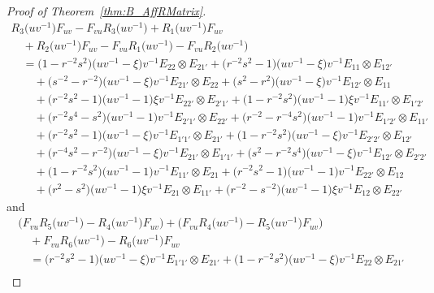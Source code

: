 \documentclass[10pt,a4paper]{amsart}
\numberwithin{equation}{section}
\begin{document}
\begin{proof}[Proof of Theorem~\ref{thm:B_AffRMatrix}]
\begin{gather}
 R_{3}\bigl(uv^{-1}\bigr)F_{uv} - F_{vu}R_{3}\bigl(uv^{-1}\bigr) + R_{1}\bigl(uv^{-1}\bigr)F_{uv}\label{eq:R123_affine}\\
\quad{} + R_{2}\bigl(uv^{-1}\bigr)F_{uv} - F_{vu}R_{1}\bigl(uv^{-1}\bigr) - F_{vu}R_{2}\bigl(uv^{-1}\bigr) \nonumber\\
 \quad{} = \bigl(1 - r^{-2}s^{2}\bigr)\bigl(uv^{-1} - \xi\bigr)v^{-1}E_{22} \otimes E_{21'} + \bigl(r^{-2}s^{2} - 1\bigr)\bigl(uv^{-1} - \xi\bigr)v^{-1}E_{11} \otimes E_{12'} \nonumber\\
 \qquad{} + \bigl(s^{-2} - r^{-2}\bigr)\bigl(uv^{-1} - \xi\bigr)v^{-1}E_{21'} \otimes E_{22} + \bigl(s^{2} - r^{2}\bigr)\bigl(uv^{-1} - \xi\bigr)v^{-1}E_{12'} \otimes E_{11} \nonumber\\
 \qquad{} + \bigl(r^{-2}s^{2} - 1\bigr)\bigl(uv^{-1} - 1\bigr)\xi v^{-1}E_{22'} \otimes E_{2'1'} + \bigl(1 - r^{-2}s^{2}\bigr)\bigl(uv^{-1} - 1\bigr)\xi v^{-1}E_{11'} \otimes E_{1'2'} \nonumber\\
 \qquad{} + \bigl(r^{-2}s^{4} - s^{2}\bigr)\bigl(uv^{-1} - 1\bigr)v^{-1}E_{2'1'} \otimes E_{22'} + \bigl(r^{-2} - r^{-4}s^{2}\bigr)\bigl(uv^{-1} - 1\bigr)v^{-1}E_{1'2'} \otimes E_{11'} \nonumber\\
 \qquad{} + \bigl(r^{-2}s^{2} - 1\bigr)\bigl(uv^{-1} - \xi\bigr)v^{-1} E_{1'1'} \otimes E_{21'} + \bigl(1 - r^{-2}s^{2}\bigr)\bigl(uv^{-1} - \xi\bigr)v^{-1}E_{2'2'} \otimes E_{12'} \nonumber\\
 \qquad{} + \bigl(r^{-4}s^{2} - r^{-2}\bigr)\bigl(uv^{-1} - \xi\bigr)v^{-1}E_{21'} \otimes E_{1'1'}+ \bigl(s^{2} - r^{-2}s^{4}\bigr)\bigl(uv^{-1} - \xi\bigr)v^{-1}E_{12'} \otimes E_{2'2'} \nonumber\\
 \qquad{} + \bigl(1 - r^{-2}s^{2}\bigr)\bigl(uv^{-1} - 1\bigr)v^{-1}E_{11'} \otimes E_{21} +\bigl(r^{-2}s^{2} - 1\bigr)\bigl(uv^{-1} - 1\bigr)v^{-1}E_{22'} \otimes E_{12} \nonumber\\
 \qquad{} + \bigl(r^{2} - s^{2}\bigr)\bigl(uv^{-1} - 1\bigr)\xi v^{-1}E_{21} \otimes E_{11'} +\bigl(r^{-2} - s^{-2}\bigr)\bigl(uv^{-1} - 1\bigr)\xi v^{-1}E_{12} \otimes E_{22'}\nonumber
\end{gather}
and
\begin{gather}
 \bigl(F_{vu}R_{5}\bigl(uv^{-1}\bigr) - R_{4}\bigl(uv^{-1}\bigr)F_{uv}\bigr) + \bigl(F_{vu}R_{4}\bigl(uv^{-1}\bigr) - R_{5}\bigl(uv^{-1}\bigr)F_{uv}\bigr) \label{eq:R456_affine}\\
 \quad {}+ F_{vu}R_{6}\bigl(uv^{-1}\bigr) - R_{6}\bigl(uv^{-1}\bigr)F_{uv} \nonumber\\
 \quad{}= \bigl(r^{-2}s^{2} - 1\bigr)\bigl(uv^{-1} - \xi\bigr)v^{-1}E_{1'1'} \otimes E_{21'} + \bigl(1 - r^{-2}s^{2}\bigr)\bigl(uv^{-1} - \xi\bigr)v^{-1}E_{22} \otimes E_{21'} \nonumber\\

\end{gather}
\end{proof}
\end{document}
